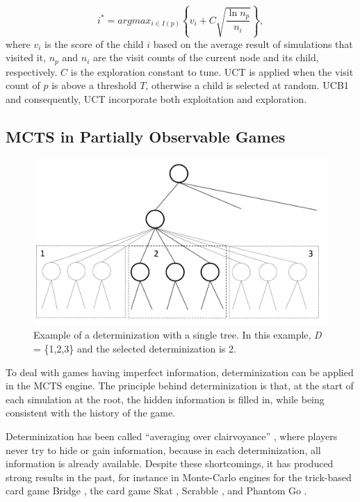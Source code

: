 \documentclass[a4paper]{llncs}
\begin{document}
\begin{equation}
\label{eq:uct}
i^* = argmax_{i \in I(p)}\left\{ v_i + C \sqrt{ \frac{\ln{n_p}}{n_i}}\right\},
\end{equation}
where $v_i$ is the score of the child $i$ based on the average result of simulations that visited it, $n_p$ and $n_i$ are the visit counts of the current node and its child, respectively. $C$ is the exploration constant to tune. UCT is applied when the visit count of $p$ is above a threshold $T$, otherwise a child is selected at random. UCB1 and consequently, UCT incorporate both exploitation and exploration.

\subsection{MCTS in Partially Observable Games}

\label{subsec:mcts-po-games}
\begin{figure}[t]
\begin{center}
\includegraphics[clip, width=\textwidth]{determinizationc.pdf}
\caption{Example of a determinization with a single tree. In this example, \emph{D} = \{1,2,3\}
and the selected determinization is 2.}
\label{fig:det}
\end{center}
\end{figure}

To deal with games having imperfect information, determinization can be applied in the MCTS engine. The principle behind determinization is that, at the start of each simulation at the root, the hidden information is filled in, while being consistent with the history of the game. 

Determinization has been called ``averaging over clairvoyance'' \cite{russell10},
where players never try to hide or gain information, because in each determinization,
all information is already available. Despite these  shortcomings, it has
produced strong results in the past, for instance in Monte-Carlo engines for the trick-based card game  Bridge \cite{ginsberg99}, the card game Skat \cite{conf/ijcai/BuroLFS09}, Scrabble \cite{sheppard02}, and Phantom Go \cite{cazenave06}. 
\end{document}
